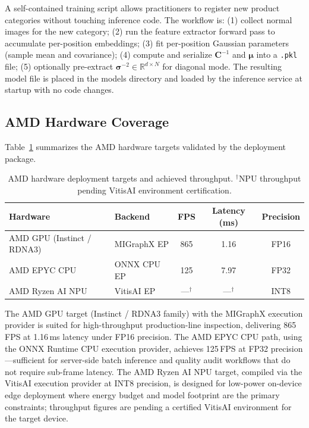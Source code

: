 \documentclass[blind]{gtac}
\begin{document}
A self-contained training script allows practitioners to register new product
categories without touching inference code.  The workflow is:
(1) collect normal images for the new category;
(2) run the feature extractor forward pass to accumulate per-position
    embeddings;
(3) fit per-position Gaussian parameters (sample mean and covariance);
(4) compute and serialize $\mathbf{C}^{-1}$ and $\boldsymbol{\mu}$ into a
    \texttt{.pkl} file;
(5) optionally pre-extract $\boldsymbol{\sigma}^{-2} \in \mathbb{R}^{d \times N}$ for diagonal mode.
The resulting model file is placed in the models directory and loaded by the
inference service at startup with no code changes.

\subsection{AMD Hardware Coverage}

Table~\ref{tab:hw} summarizes the AMD hardware targets validated by the
deployment package.

\begin{table}[H]
\centering
\caption{AMD hardware deployment targets and achieved throughput.
$^\dagger$NPU throughput pending VitisAI environment certification.}
\label{tab:hw}
\footnotesize
\begin{tabular}{@{}llccc@{}}
\toprule
Hardware & Backend & FPS & Latency (ms) & Precision \\
\midrule
AMD GPU (Instinct / RDNA3) & MIGraphX EP & 865 & 1.16 & FP16 \\
AMD EPYC CPU               & ONNX CPU EP & 125 & 7.97 & FP32 \\
AMD Ryzen AI NPU           & VitisAI EP  & ---$^\dagger$ & ---$^\dagger$ & INT8 \\
\bottomrule
\end{tabular}
\end{table}

The AMD GPU target (Instinct / RDNA3 family) with the MIGraphX execution provider
is suited for high-throughput production-line inspection, delivering 865\,FPS at
1.16\,ms latency under FP16 precision.  The AMD EPYC CPU path, using the ONNX
Runtime CPU execution provider, achieves 125\,FPS at FP32 precision---sufficient
for server-side batch inference and quality audit workflows that do not require
sub-frame latency.  The AMD Ryzen AI NPU target, compiled via the VitisAI
execution provider at INT8 precision, is designed for low-power on-device edge
deployment where energy budget and model footprint are the primary constraints;
throughput figures are pending a certified VitisAI environment for the target
device.
\end{document}
